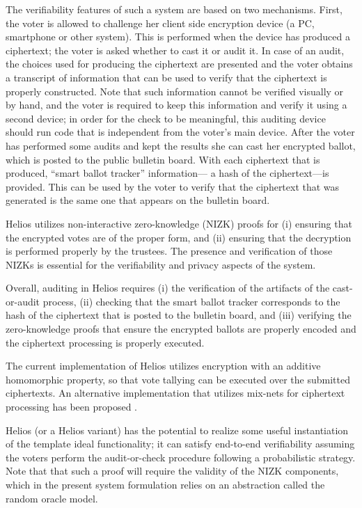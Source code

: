 The verifiability features of such a system are based on two
mechanisms. First, the voter is allowed to challenge her client side
encryption device (a PC, smartphone or other system). This is
performed when the device has produced a ciphertext; the voter is
asked whether to cast it or audit it. In case of an audit, the choices
used for producing the ciphertext are presented and the voter obtains
a transcript of information that can be used to verify that the
ciphertext is properly constructed. Note that such information cannot
be verified visually or by hand, and the voter is required to keep
this information and verify it using a second device; in order for the
check to be meaningful, this auditing device should run code that is
independent from the voter's main device. After the voter has
performed some audits and kept the results she can cast her
encrypted ballot, which is posted to the public bulletin board. With
each ciphertext that is produced, ``smart ballot tracker''
information--- a hash of the ciphertext---is provided. This can be
used by the voter to verify that the ciphertext that was generated is
the same one that appears on the bulletin board.

Helios utilizes non-interactive zero-knowledge (NIZK) proofs for (i)
ensuring that the encrypted votes are of the proper form, and (ii)
ensuring that the decryption is performed properly by the
trustees. The presence and verification of those NIZKs is essential
for the verifiability and privacy aspects of the system.

Overall, auditing in Helios requires (i) the verification of the
artifacts of the cast-or-audit process, (ii) checking that the smart
ballot tracker corresponds to the hash of the ciphertext that is
posted to the bulletin board, and (iii) verifying the zero-knowledge
proofs that ensure the encrypted ballots are properly encoded and the
ciphertext processing is properly executed.

The current implementation of Helios utilizes encryption with an
additive homomorphic property, so that vote tallying can be executed
over the submitted ciphertexts. An alternative implementation that
utilizes mix-nets for ciphertext processing has been proposed
\cite{tsoukalas2013}.

Helios (or a Helios variant) has the potential to realize some useful
instantiation of the template ideal functionality; it can satisfy
end-to-end verifiability assuming the voters perform the
audit-or-check procedure following a probabilistic strategy. Note that
that such a proof will require the validity of the NIZK components,
which in the present system formulation relies on an abstraction
called the random oracle model.

